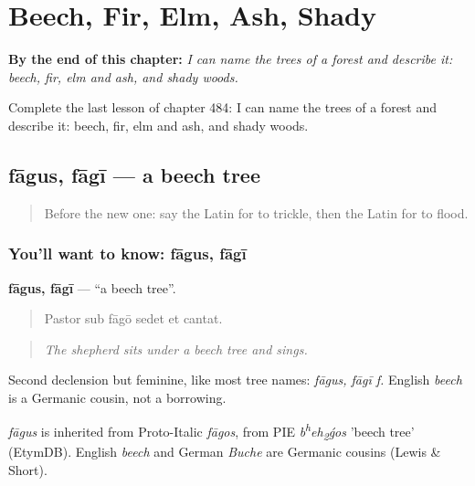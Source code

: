 
\chapter{Beech, Fir, Elm, Ash, Shady}
\label{ch:la-beech-fir-elm-ash-shady}

\begin{chapteropening}
\textbf{By the end of this chapter:} \emph{I can name the trees of a forest and describe it: beech, fir, elm and ash, and shady woods.}

Complete the last lesson of chapter 484: I can name the trees of a forest and describe it: beech, fir, elm and ash, and shady woods.
\end{chapteropening}

\section[fāgus, fāgī]{fāgus, fāgī — a beech tree}

\label{lesson:LA-C484-fagus}



\begin{quote}
Before the new one: say the Latin for to trickle, then the Latin for to flood.
\end{quote}

\subsection*{You'll want to know: fāgus, fāgī}
\textbf{fāgus, fāgī} — \textquotedblleft{}a beech tree\textquotedblright{}.

\begin{quote}
Pastor sub fāgō sedet et cantat.
\end{quote}

\begin{quote}
\emph{The shepherd sits under a beech tree and sings.}
\end{quote}

Second declension but feminine, like most tree names: \emph{fāgus, fāgī f.} English \emph{beech} is a Germanic cousin, not a borrowing.

\begin{cousinweb}
\emph{fāgus} is inherited from Proto-Italic \emph{fāgos}, from PIE \emph{b\textsuperscript{h}eh\textsubscript{2}ǵos} 'beech tree' (EtymDB). English \emph{beech} and German \emph{Buche} are Germanic cousins (Lewis \& Short).
\end{cousinweb}

